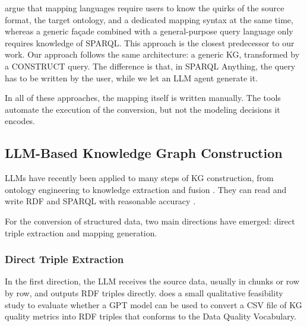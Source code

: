 \citet{asprino2023facade} argue that mapping languages require users to know the quirks of the source format, the target ontology, and a dedicated mapping syntax at the same time, whereas a generic façade combined with a general-purpose query language only requires knowledge of SPARQL\@. This approach is the closest predecessor to our work. Our approach follows the same architecture: a generic KG, transformed by a CONSTRUCT query. The difference is that, in SPARQL Anything, the query has to be written by the user, while we let an LLM agent generate it.

In all of these approaches, the mapping itself is written manually. The tools automate the execution of the conversion, but not the modeling decisions it encodes.



\subsection{LLM-Based Knowledge Graph Construction}
\label{sec:rw-llm}
LLMs have recently been applied to many steps of KG construction, from ontology engineering to knowledge extraction and fusion \citep{bian2025llm}. They can read and write RDF and SPARQL with reasonable accuracy \citep{frey2023benchmarking, meyer2025llm}. 

For the conversion of structured data, two main directions have emerged: direct triple extraction and mapping generation.

\subsubsection{Direct Triple Extraction}
In the first direction, the LLM receives the source data, usually in chunks or row by row, and outputs RDF triples directly. 
\citet{tuozzo2024moving} does a small qualitative feasibility study to evaluate whether a GPT model can be used to convert a CSV file of KG quality metrics into RDF triples that conforms to the Data Quality Vocabulary. 


